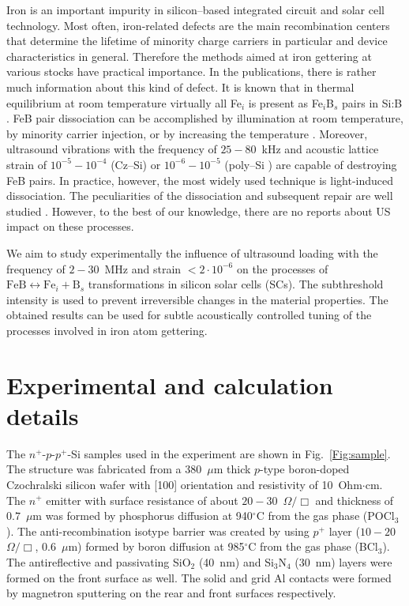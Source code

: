 \documentclass[%
 aip,jap,
 amsmath,amssymb,
 reprint,%
]{revtex4-1}
\begin{document}
Iron is an important impurity in silicon--based integrated circuit and solar cell technology.
Most often, iron-related defects are the main recombination centers that determine the lifetime of  minority charge carriers in particular and device characteristics in general.
Therefore the methods aimed at iron gettering at various stocks have practical importance.
In the publications, there is rather much information about this kind of defect.
It is known that in thermal equilibrium at room temperature virtually all Fe$_i$ is present as Fe$_i$B$_s$ pairs in Si:B \cite{FeBLight2,FeBJAP2005}.
FeB pair dissociation can be accomplished by illumination at room temperature, by minority carrier injection, or by increasing the temperature \cite{FeBLight2,FeBAssJAP2014,FeB_Zong}.
Moreover, ultrasound  vibrations with the frequency of $25-80$~kHz and acoustic lattice strain of $10^{-5}-10^{-4}$ (Cz--Si\cite{Ostapenko1995})
or $10^{-6}-10^{-5}$ (poly--Si \cite{Ostapenko1995SST,Ostapenko1994APL}) are capable of destroying FeB pairs.
In practice, however, the most widely used technique is light-induced dissociation.
The peculiarities of the dissociation and subsequent repair are well studied \cite{FeBLight2,FeBKin2019,FeBAssJAP2014,FeBJAP2005,FeBAssSST2011,lauer2016,FeBStrongIll,FeBkinAPL2008,FeBKinAPL2013}. However, to the best of our knowledge, there are no reports about US impact on these processes.

We aim  to study experimentally the influence of ultrasound loading with the
frequency of $2-30$~MHz and  strain $<2\cdot10^{-6}$ on the
processes of $\mathrm{FeB}\leftrightarrow\mathrm{Fe}_i+\mathrm{B}_s$ transformations in silicon solar cells (SCs).
The subthreshold intensity is used to prevent irreversible changes in the material properties.
The obtained results can be used for subtle acoustically controlled tuning of the processes involved in iron atom gettering.

\section{\label{sec:Exp}Experimental and calculation details}


The $n^+$-$p$-$p^+$-Si samples used in the experiment are shown in Fig.~\ref{Fig:sample}.
The structure was fabricated from a 380~$\mu$m thick $p$-type boron-doped
Czochralski silicon wafer with [100] orientation and resistivity of 10~Ohm$\cdot$cm.
The $n^+$ emitter with surface resistance of about $20-30$~$\Omega/\Box$
and  thickness of $0.7$~$\mu$m was formed by phosphorus diffusion at 940$^\circ$C from the gas phase (POCl$_3$).
The anti-recombination isotype barrier was created by using $p^+$
layer ($10-20$~$\Omega/\Box$, $0.6$~$\mu$m) formed by boron diffusion at 985$^\circ$C from the gas phase (BCl$_3$).
The antireflective and passivating SiO$_2$ (40~nm) and Si$_3$N$_4$ (30~nm) layers
were formed on the front surface as well.
The solid and grid Al contacts were formed by magnetron sputtering on the rear and front surfaces respectively.
\end{document}
